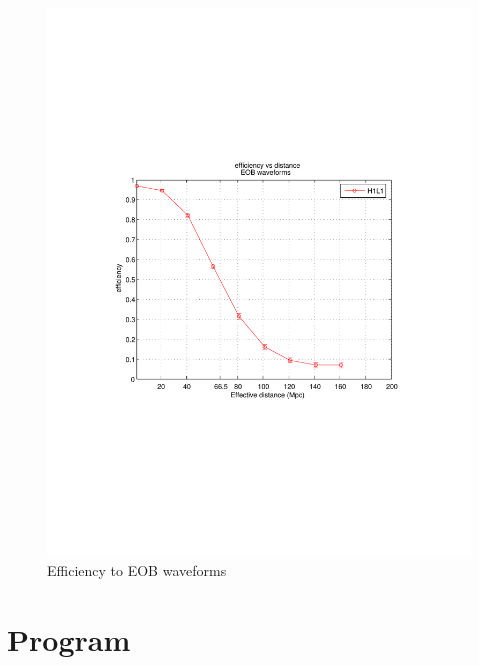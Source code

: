 \begin{figure}[h]
\begin{center}
\includegraphics[width=1.0\textwidth]{figures/H1L1_eff_eob_20050829_3.pdf}
\caption{Efficiency to EOB waveforms}
\label{fig:eobeff}
\end{center}
\end{figure}

\clearpage

\section{Program }
\label{program:lalapps-burca}

